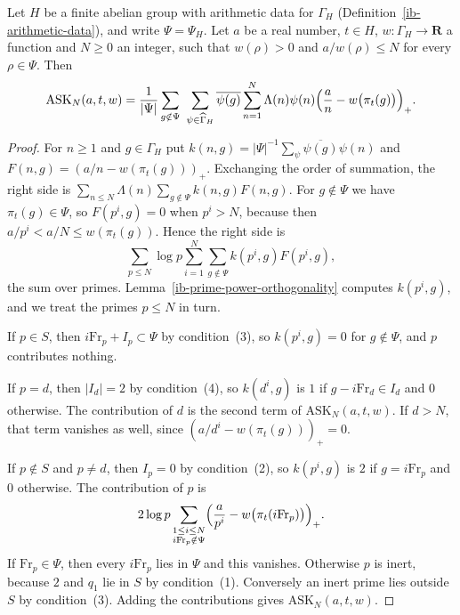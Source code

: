 \begin{lemma}\label{ib-inert-expansion}
Let $H$ be a finite abelian group with arithmetic data for $\Gamma_H$
(Definition~\ref{ib-arithmetic-data}), and write $\Psi=\Psi_H$. Let $a$ be a
real number, $t\in H$, $w:\Gamma_H\to\mathbf R$ a function and $N\geq0$ an
integer, such that $w(\rho)>0$ and $a/w(\rho)\leq N$ for every $\rho\in\Psi$.
Then
\[
 \mathrm{ASK}_N(a,t,w)=\frac1{|\Psi|}\sum_{g\notin\Psi}\ \sum_{\psi\in\widehat\Gamma_H}
 \overline{\psi(g)}\sum_{n=1}^N\Lambda(n)\psi(n)
 \Bigl(\frac an-w\bigl(\pi_t(g)\bigr)\Bigr)_+.
\]
\end{lemma}
\begin{proof}
For $n\geq1$ and $g\in\Gamma_H$ put
$k(n,g)=|\Psi|^{-1}\sum_\psi\overline{\psi(g)}\psi(n)$ and
$F(n,g)=(a/n-w(\pi_t(g)))_+$. Exchanging the order of summation, the right side
is $\sum_{n\leq N}\Lambda(n)\sum_{g\notin\Psi}k(n,g)F(n,g)$. For $g\notin\Psi$
we have $\pi_t(g)\in\Psi$, so $F(p^i,g)=0$ when $p^i>N$, because then
$a/p^i<a/N\leq w(\pi_t(g))$. Hence the right side is
\[
 \sum_{p\leq N}\log p\sum_{i=1}^N\sum_{g\notin\Psi}k(p^i,g)F(p^i,g),
\]
the sum over primes. Lemma~\ref{ib-prime-power-orthogonality} computes
$k(p^i,g)$, and we treat the primes $p\leq N$ in turn.

If $p\in S$, then $i\mathrm{Fr}_p+I_p\subset\Psi$ by condition~(3), so
$k(p^i,g)=0$ for $g\notin\Psi$, and $p$ contributes nothing.

If $p=d$, then $|I_d|=2$ by condition~(4), so $k(d^i,g)$ is $1$ if
$g-i\mathrm{Fr}_d\in I_d$ and $0$ otherwise. The contribution of $d$ is the
second term of $\mathrm{ASK}_N(a,t,w)$. If $d>N$, that term vanishes as well,
since $(a/d^i-w(\pi_t(g)))_+=0$.

If $p\notin S$ and $p\neq d$, then $I_p=0$ by condition~(2), so $k(p^i,g)$ is $2$
if $g=i\mathrm{Fr}_p$ and $0$ otherwise. The contribution of $p$ is
\[
 2\log p\sum_{\substack{1\leq i\leq N\\ i\mathrm{Fr}_p\notin\Psi}}
 \Bigl(\frac a{p^i}-w\bigl(\pi_t(i\mathrm{Fr}_p)\bigr)\Bigr)_+ .
\]
If $\mathrm{Fr}_p\in\Psi$, then every $i\mathrm{Fr}_p$ lies in $\Psi$ and this
vanishes. Otherwise $p$ is inert, because $2$ and $q_1$ lie in $S$ by
condition~(1). Conversely an inert prime lies outside $S$ by condition~(3).
Adding the contributions gives $\mathrm{ASK}_N(a,t,w)$.
\end{proof}

